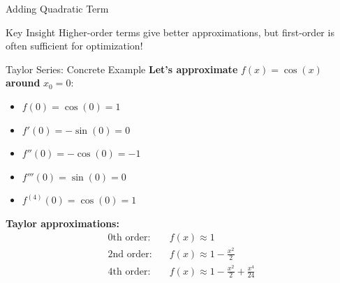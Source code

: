 \documentclass[usenames,dvipsnames]{beamer}
\begin{document}
  \begin{frame}{Adding Quadratic Term}
    \begin{center}
    \end{center}

    \begin{alertbox}{Key Insight}
    Higher-order terms give better approximations, but first-order is often sufficient for optimization!
    \end{alertbox}
  \end{frame}

  \begin{frame}{Taylor Series: Concrete Example}
    \textbf{Let's approximate} $f(x) = \cos(x)$ \textbf{around} $x_0 = 0$:
    
    \begin{itemize}[<+->]
        \item $f(0) = \cos(0) = 1$
        \item $f'(0) = -\sin(0) = 0$
        \item $f''(0) = -\cos(0) = -1$
        \item $f'''(0) = \sin(0) = 0$
        \item $f^{(4)}(0) = \cos(0) = 1$
    \end{itemize}
    
    \pause
    \textbf{Taylor approximations:}
    \begin{align}
        \text{0th order:} \quad &f(x) \approx 1\\
        \text{2nd order:} \quad &f(x) \approx 1 - \frac{x^2}{2}\\
        \text{4th order:} \quad &f(x) \approx 1 - \frac{x^2}{2} + \frac{x^4}{24}
    \end{align}
  \end{frame}
\end{document}
